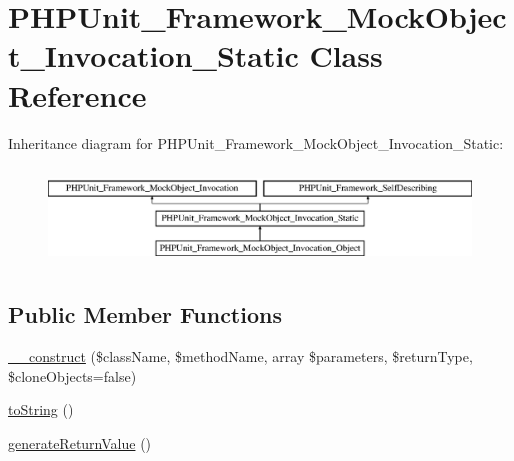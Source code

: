 \hypertarget{class_p_h_p_unit___framework___mock_object___invocation___static}{}\section{P\+H\+P\+Unit\+\_\+\+Framework\+\_\+\+Mock\+Object\+\_\+\+Invocation\+\_\+\+Static Class Reference}
\label{class_p_h_p_unit___framework___mock_object___invocation___static}
Inheritance diagram for P\+H\+P\+Unit\+\_\+\+Framework\+\_\+\+Mock\+Object\+\_\+\+Invocation\+\_\+\+Static\+:\begin{figure}[H]
\begin{center}
\leavevmode
\includegraphics[height=2.625000cm]{class_p_h_p_unit___framework___mock_object___invocation___static}
\end{center}
\end{figure}
\subsection*{Public Member Functions}
\begin{DoxyCompactItemize}
\item 
\mbox{\hyperlink{class_p_h_p_unit___framework___mock_object___invocation___static_a26060ff021810f603c6f084da47c4204}{\+\_\+\+\_\+construct}} (\$class\+Name, \$method\+Name, array \$parameters, \$return\+Type, \$clone\+Objects=false)
\item 
\mbox{\hyperlink{class_p_h_p_unit___framework___mock_object___invocation___static_a5558c5d549f41597377fa1ea8a1cefa3}{to\+String}} ()
\item 
\mbox{\hyperlink{class_p_h_p_unit___framework___mock_object___invocation___static_af64f7ab3f0f61dbcf7e63601099137d1}{generate\+Return\+Value}} ()
\end{DoxyCompactItemize}

